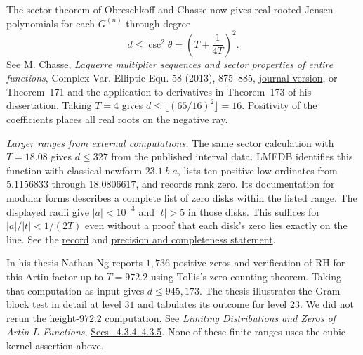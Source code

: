 The sector theorem of Obreschkoff and Chasse now gives real-rooted
Jensen polynomials for each $G^{(n)}$ through degree
\[
   d\le\csc^2\theta=\left(T+\frac{1}{4T}\right)^2.
\]
See M. Chasse, \emph{Laguerre multiplier sequences and sector properties
of entire functions}, Complex Var. Elliptic Equ. 58 (2013), 875--885,
\href{https://doi.org/10.1080/17476933.2011.584250}{journal version}, or
Theorem~171 and the application to derivatives in Theorem~173 of his
\href{https://people.kth.se/~chasse/dissertation.pdf}{dissertation}.
Taking $T=4$ gives $d\le\lfloor(65/16)^2\rfloor=16$.
Positivity of the coefficients places all real roots on the negative ray.

\textit{Larger ranges from external computations.}
The same sector calculation with $T=18.08$ gives $d\le327$ from the
published interval data. LMFDB identifies this function with classical
newform $23.1.b.a$, lists ten positive low ordinates from $5.1156833$
through $18.0806617$, and records rank zero. Its documentation for modular
forms describes a complete list of zero disks within the listed range.
The displayed radii give $|a|<10^{-3}$ and $|t|>5$ in those disks.
This suffices for $|a|/|t|<1/(2T)$ even without a proof that each disk's
zero lies exactly on the line. See the
\href{https://www.lmfdb.org/L/2/23/23.22/c0/0/0}{record} and
\href{https://www.lmfdb.org/L/2/23/23.22/c0/0/0/Reliability}{precision
and completeness statement}.

In his thesis Nathan Ng reports $1{,}736$ positive zeros and verification
of RH for this Artin factor up to $T=972.2$ using Tollis's zero-counting
theorem. Taking that computation as input gives $d\le945{,}173$. The
thesis illustrates the Gram-block test in detail at level $31$ and
tabulates its outcome for level $23$. We did not rerun the height-$972.2$
computation. See \emph{Limiting Distributions and Zeros of Artin
$L$-Functions}, \href{https://www.cs.uleth.ca/~nathanng/RESEARCH/phd.thesis.pdf}{Secs.~4.3.4--4.3.5}.
None of these finite ranges uses the cubic kernel assertion above.
